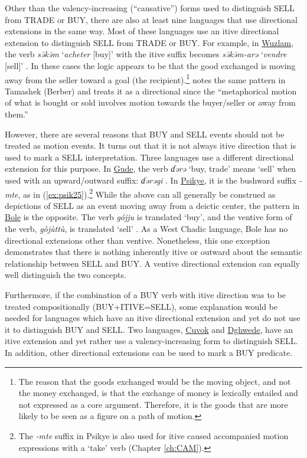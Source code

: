 Other than the valency-increasing (``causative'') forms used to distinguish SELL from TRADE or BUY, there are also at least nine languages that use directional extensions in the same way. Most of these languages use an itive directional extension to distinguish SELL from TRADE or BUY. For example, in \hyperref[wuzl]{Wuzlam}, the verb \textit{sə̄kə̄m} `\textit{acheter} [buy]' with the itive suffix becomes \textit{sə̄kə̄m-arə} `\textit{vendre} [sell]' \citep[162]{colombelLangueOuldemeNordCameroun2005}. In these cases the logic appears to be that the good exchanged is moving away from the seller toward a goal (the recipient).\footnote{The reason that the goods exchanged would be the moving object, and not the money exchanged, is that the exchange of money is lexically entailed and not expressed as a core argument. Therefore, it is the goods that are more likely to be seen as a figure on a path of motion.} \citet[134]{dryerAssociatedMotionDirectionals2021} notes the same pattern in Tamashek (Berber) and treats it as a directional since the ``metaphorical motion of what is bought or sold involves motion towards the buyer/seller or away from them.''

However, there are several reasons that BUY and SELL events should not be treated as motion events. It turns out that it is not always itive direction that is used to mark a SELL interpretation. Three languages use a different directional extension for this purpose. In \hyperref[gude]{Gude}, the verb \textit{ɗərə} `buy, trade' means `sell' when used with an upward/outward suffix: \textit{ɗərəgi} \citep[182]{hoskinsonGrammarDictionaryGude1983}. In \hyperref[psik]{Psikye}, it is the bushward suffix \textit{-mte}, as in (\ref{ex:psik25}).\footnote{The \textit{-mte} suffix in Psikye is also used for itive caused accompanied motion expressions with a `take' verb (Chapter \ref{ch:CAM}).} While the above can all generally be construed as depictions of SELL as an event moving away from a deictic center, the pattern in \hyperref[bole]{Bole} is the opposite. The verb \textit{gójju}  is translated `buy', and the ventive form of the verb, \textit{gòjùttù}, is translated `sell' \citep[36]{gimbaBoleenglishhausaDictionaryAlhaji2004}. As a West Chadic language, Bole has no directional extensions other than ventive. Nonetheless, this one exception demonstrates that there is nothing inherently itive or outward about the semantic relationship between SELL and BUY. A ventive directional extension can equally well distinguish the two concepts. 

Furthermore, if the combination of a BUY verb with itive direction was to be treated compositionally (BUY+ITIVE=SELL), some explanation would be needed for languages which have an itive directional extension and yet do not use it to distinguish BUY and SELL. Two languages, \hyperref[cuvo]{Cuvok} and \hyperref[dghw]{Dghwede}, have an itive extension and yet rather use a valency-increasing form to distinguish SELL. In addition, other directional extensions can be used to mark a BUY predicate. 

